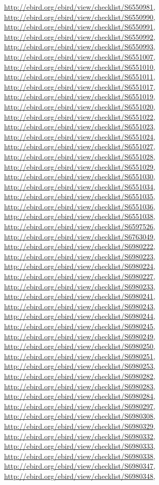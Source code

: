 \documentclass[9pt, article]{memoir}
\begin{document}
\begin{multicols}{2}
\url{http://ebird.org/ebird/view/checklist/S6550981}, 
\url{http://ebird.org/ebird/view/checklist/S6550990}, 
\url{http://ebird.org/ebird/view/checklist/S6550991}, 
\url{http://ebird.org/ebird/view/checklist/S6550992}, 
\url{http://ebird.org/ebird/view/checklist/S6550993}, 
\url{http://ebird.org/ebird/view/checklist/S6551007}, 
\url{http://ebird.org/ebird/view/checklist/S6551010}, 
\url{http://ebird.org/ebird/view/checklist/S6551011}, 
\url{http://ebird.org/ebird/view/checklist/S6551017}, 
\url{http://ebird.org/ebird/view/checklist/S6551019}, 
\url{http://ebird.org/ebird/view/checklist/S6551020}, 
\url{http://ebird.org/ebird/view/checklist/S6551022}, 
\url{http://ebird.org/ebird/view/checklist/S6551023}, 
\url{http://ebird.org/ebird/view/checklist/S6551024}, 
\url{http://ebird.org/ebird/view/checklist/S6551027}, 
\url{http://ebird.org/ebird/view/checklist/S6551028}, 
\url{http://ebird.org/ebird/view/checklist/S6551029}, 
\url{http://ebird.org/ebird/view/checklist/S6551030}, 
\url{http://ebird.org/ebird/view/checklist/S6551034}, 
\url{http://ebird.org/ebird/view/checklist/S6551035}, 
\url{http://ebird.org/ebird/view/checklist/S6551036}, 
\url{http://ebird.org/ebird/view/checklist/S6551038}, 
\url{http://ebird.org/ebird/view/checklist/S6597526}, 
\url{http://ebird.org/ebird/view/checklist/S6763049}, 
\url{http://ebird.org/ebird/view/checklist/S6980222}, 
\url{http://ebird.org/ebird/view/checklist/S6980223}, 
\url{http://ebird.org/ebird/view/checklist/S6980224}, 
\url{http://ebird.org/ebird/view/checklist/S6980227}, 
\url{http://ebird.org/ebird/view/checklist/S6980233}, 
\url{http://ebird.org/ebird/view/checklist/S6980241}, 
\url{http://ebird.org/ebird/view/checklist/S6980243}, 
\url{http://ebird.org/ebird/view/checklist/S6980244}, 
\url{http://ebird.org/ebird/view/checklist/S6980245}, 
\url{http://ebird.org/ebird/view/checklist/S6980249}, 
\url{http://ebird.org/ebird/view/checklist/S6980250}, 
\url{http://ebird.org/ebird/view/checklist/S6980251}, 
\url{http://ebird.org/ebird/view/checklist/S6980253}, 
\url{http://ebird.org/ebird/view/checklist/S6980282}, 
\url{http://ebird.org/ebird/view/checklist/S6980283}, 
\url{http://ebird.org/ebird/view/checklist/S6980284}, 
\url{http://ebird.org/ebird/view/checklist/S6980297}, 
\url{http://ebird.org/ebird/view/checklist/S6980308}, 
\url{http://ebird.org/ebird/view/checklist/S6980329}, 
\url{http://ebird.org/ebird/view/checklist/S6980332}, 
\url{http://ebird.org/ebird/view/checklist/S6980333}, 
\url{http://ebird.org/ebird/view/checklist/S6980338}, 
\url{http://ebird.org/ebird/view/checklist/S6980347}, 
\url{http://ebird.org/ebird/view/checklist/S6980348}, 

\end{multicols}
\end{document}
